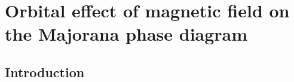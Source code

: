 \chapter{Orbital effect of magnetic field on the Majorana phase diagram}
\label{ch:orbitalfield}

\newpage
\noindent 
\section{Introduction}



